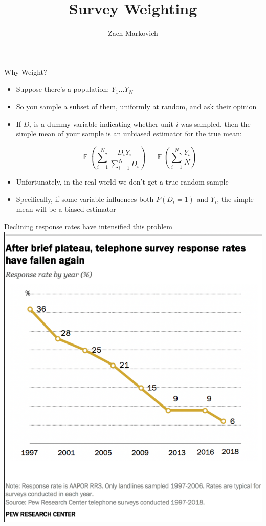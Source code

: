 \documentclass{beamer}
\DeclareMathOperator*{\E}{\mathbb{E}}
\begin{document}
	\title{Survey Weighting}
	\author{Zach Markovich}
	\frame[plain]{\titlepage}
	\setcounter{framenumber}{0}

\begin{frame}{Why Weight?}
\begin{itemize} 
\item Suppose there's a population: $Y_1 \dots Y_N$ \pause 

\item So you sample a subset of them, uniformly at random, and ask their opinion \pause 

\item If $D_i$ is a dummy variable indicating whether unit $i$ was sampled, then the simple mean of your sample is an unbiased estimator for the true mean:\pause 

$$
\E\left(\sum_{i=1}^N \frac{D_i Y_i}{\sum_{i=1}^N D_i}\right) = \E\left(\sum_{i=1}^N \frac{Y_i}{N}\right) 
$$	

\pause 
\item Unfortunately, in the real world we don't get a true random sample \pause 
\item Specifically, if some variable influences both $P(D_i=1)$ and $Y_i$, the simple mean will be a biased estimator
\end{itemize}
\end{frame}

\begin{frame}{Declining response rates have intensified this problem}
	\centering 
\includegraphics[height=.9\textheight]{response_rates.png}
\end{frame}
\end{document}

